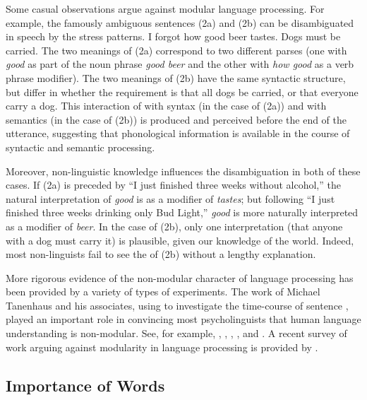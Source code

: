 \documentclass[a4paper]{article}
\begin{document}
Some casual observations argue against modular language processing.  For example, the famously ambiguous sentences (2a) and (2b) can be disambiguated in speech by the stress patterns.
\eal
\ex I forgot how good beer tastes.
\ex Dogs must be carried.
\zl
The two meanings of (2a) correspond to two different parses (one with {\it good} as part of the noun phrase {\it good beer} and the other with {\it how good} as a verb phrase modifier).  The two meanings of (2b) have the same syntactic structure, but differ in whether the requirement is that all dogs be carried, or that everyone carry a dog.  This interaction of  with syntax (in the case of (2a)) and with semantics (in the case of (2b)) is produced and perceived before the end of the utterance, suggesting that phonological information is available in the course of syntactic and semantic processing.  

Moreover, non-linguistic knowledge influences the disambiguation in both of these cases.  If (2a) is preceded by ``I just finished three weeks without alcohol,'' the natural interpretation of {\it good} is as a modifier of {\it tastes}; but following ``I just finished three weeks drinking only Bud Light,'' {\it good} is more naturally interpreted as a modifier of {\it beer}.  In the case of (2b), only one interpretation (that anyone with a dog must carry it) is plausible, given our knowledge of the world.  Indeed, most non-linguists fail to see the  of (2b) without a lengthy explanation.  

More rigorous evidence of the non-modular character of language processing has been provided by a variety of types of experiments.  The work of Michael Tanenhaus  and his associates, using  to investigate the time-course of sentence , played an important role in convincing most psycholinguists that human language understanding is non-modular.  See, for example, \citet{EberhardEtal95}, \citet{McMurrayEtal2008}, \citet{TSKES95a}, \citet{TSKES96a}, and \citet{TanenhausTrueswell95}. A recent survey of work arguing against modularity in language processing is provided by \citet{SpevackEtal2018}.  

\subsection{Importance of Words}
\end{document}
